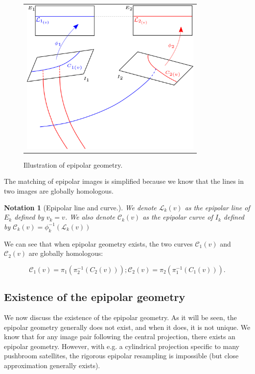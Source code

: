 \documentclass{ipol}
\newcommand{\PiOT}[1]{\pi_1(\pi_2^{-1}(#1))}
\newcommand{\PiTO}[1]{\pi_2(\pi_1^{-1}(#1))}
\newcommand{\LineE}[1]{\ensuremath{\mathcal{L}_{#1}}}
\newcommand{\LineK}{\LineE{k}}
\newcommand{\CurveE}[1]{\ensuremath{\mathcal{C}_{#1}}}
\newcommand{\CurveO}{\CurveE{1}}
\newcommand{\CurveT}{\CurveE{2}}
\newcommand{\CurveK}{\CurveE{k}}
\newtheorem{notation}{Notation}
\newcommand{\er}[1]{\textcolor{orange}{#1}}
\begin{document}
\begin{figure}
\centering
\begin{tabular}{c}
\includegraphics[width=9cm]{FIGS/Epip.png} 
\end{tabular}
\caption{Illustration of epipolar geometry.}
\label{FigDefEpip}
\end{figure}


\noindent The matching of epipolar images is simplified because we know that the lines in two images are globally homologous. 


\begin{notation}[Epipolar line and curve.]
We denote $\LineK(v)$  as the epipolar  line of $E_k$ defined by $v_k=v$. We also denote $\CurveK(v)$ as the epipolar
curve of $I_k$ defined by $\CurveK(v) = \phi_k^{-1}(\LineK(v))$
\end{notation}
%
\noindent We can see that when epipolar geometry exists, the two curves $\CurveO(v)$ and $\CurveT(v)$ are globally homologous:

\begin{equation}
     \CurveO(v) = \PiOT{C_2(v)}   ;  \CurveT(v) = \PiTO{C_1(v)}.\label{Eq:CurvHom}
\end{equation}



\subsection{Existence of the epipolar geometry}\label{ExistEpip} 

We now discuss the existence of the {epipolar geometry}. As it will be seen, the epipolar geometry generally does not exist, and when it does, it is not unique. We know that for any image pair following the {central projection}, there exists an epipolar geometry. However, with e.g. a cylindrical projection specific to many pushbroom satellites, the {rigorous} epipolar resampling is impossible {(but close approximation generally exists)}.
\end{document}
